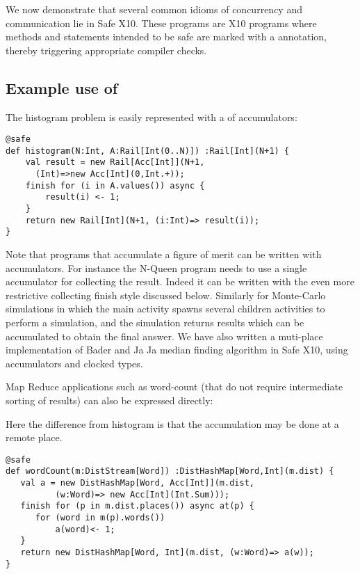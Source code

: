 We now demonstrate that several common idioms of concurrency and
communication lie in Safe X10. These programs are X10 programs where
methods and statements intended to be safe are marked with a
 annotation, thereby triggering appropriate compiler
checks.

\subsection{Example use of }
\begin{example}[Histogram]
The histogram problem is easily represented with a  of
accumulators: 
\begin{lstlisting}
@safe
def histogram(N:Int, A:Rail[Int(0..N)]) :Rail[Int](N+1) {
    val result = new Rail[Acc[Int]](N+1,
      (Int)=>new Acc[Int](0,Int.+));
    finish for (i in A.values()) async {
        result(i) <- 1;
    }
    return new Rail[Int](N+1, (i:Int)=> result(i));
}
\end{lstlisting}
\end{example}
Note that programs that accumulate a figure of merit can be written
with accumulators. For instance the N-Queen program needs to use a
single accumulator for collecting the result. Indeed it can be written
with the even more restrictive collecting finish style discussed
below. Similarly for Monte-Carlo simulations in which the main
activity spawns several children activities to perform a simulation,
and the simulation returns results which can be accumulated to
obtain the final answer. We have also written a muti-place
implementation of Bader and Ja Ja median finding algorithm in Safe
X10, using accumulators and clocked types. 

Map Reduce applications such as word-count (that do not require
intermediate sorting of results) can also be expressed directly:
\begin{example}
Here the difference from histogram is that the accumulation may be
done at a remote place. 
\begin{lstlisting}
@safe
def wordCount(m:DistStream[Word]) :DistHashMap[Word,Int](m.dist) {
   val a = new DistHashMap[Word, Acc[Int]](m.dist,
          (w:Word)=> new Acc[Int](Int.Sum)));
   finish for (p in m.dist.places()) async at(p) {
      for (word in m(p).words())
          a(word)<- 1;
   }
   return new DistHashMap[Word, Int](m.dist, (w:Word)=> a(w));
}
\end{lstlisting}

\end{example}


